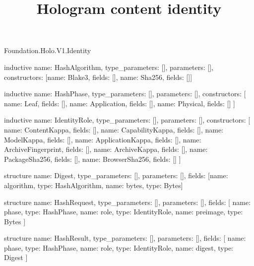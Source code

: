 \begin{lexlean}{Foundation.Holo.V1.Identity}
\title{Hologram content identity}
\begin{semanticmodule}
inductive{
  name: HashAlgorithm,
  type_parameters: [],
  parameters: [],
  constructors: [{name: Blake3, fields: []}, {name: Sha256, fields: []}]
}

inductive{
  name: HashPhase,
  type_parameters: [],
  parameters: [],
  constructors: [
    {name: Leaf, fields: []},
    {name: Application, fields: []},
    {name: Physical, fields: []}
  ]
}

inductive{
  name: IdentityRole,
  type_parameters: [],
  parameters: [],
  constructors: [
    {name: ContentKappa, fields: []},
    {name: CapabilityKappa, fields: []},
    {name: ModelKappa, fields: []},
    {name: ApplicationKappa, fields: []},
    {name: ArchiveFingerprint, fields: []},
    {name: ArchiveKappa, fields: []},
    {name: PackageSha256, fields: []},
    {name: BrowserSha256, fields: []}
  ]
}

structure{
  name: Digest,
  type_parameters: [],
  parameters: [],
  fields: [{name: algorithm, type: HashAlgorithm}, {name: bytes, type: Bytes}]
}

structure{
  name: HashRequest,
  type_parameters: [],
  parameters: [],
  fields: [
    {name: phase, type: HashPhase},
    {name: role, type: IdentityRole},
    {name: preimage, type: Bytes}
  ]
}

structure{
  name: HashResult,
  type_parameters: [],
  parameters: [],
  fields: [
    {name: phase, type: HashPhase},
    {name: role, type: IdentityRole},
    {name: digest, type: Digest}
  ]
}
\end{semanticmodule}
\end{lexlean}
